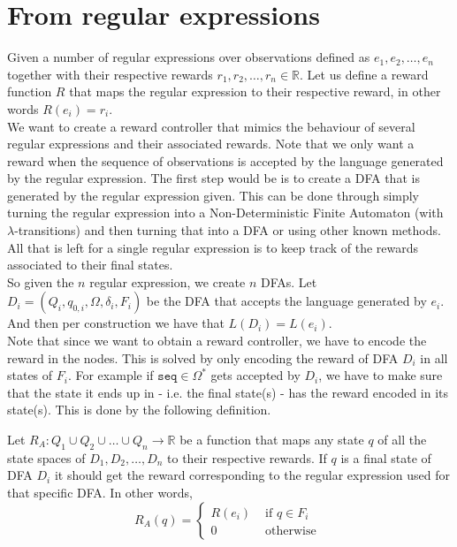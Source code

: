 \section{From regular expressions}
\label{sec:rc-regex}


Given a number of regular expressions over observations defined as $e_1,e_2,\dots,e_n$ together with their respective rewards $r_1,r_2,\dots,r_n\in\mathbb{R}$. Let us define a reward function $R$ that maps the regular expression to their respective reward, in other words $R(e_i)=r_i$. \\

We want to create a reward controller that mimics the behaviour of several regular expressions and their associated rewards. Note that we only want a reward when the sequence of observations is accepted by the language generated by the regular expression. The first step would be is to create a DFA that is generated by the regular expression given. This can be done through simply turning the regular expression into a Non-Deterministic Finite Automaton (with $\lambda$-transitions) and then turning that into a DFA or using other known methods\cite{p:regex-to-dfa}. All that is left for a single regular expression is to keep track of the rewards associated to their final states.\\

So given the $n$ regular expression, we create $n$ DFAs. Let $D_i=(Q_i,q_{0,i},\Omega, \delta_i,F_i)$ be the DFA that accepts the language generated by $e_i$. And then per construction we have that $L(D_i)=L(e_i)$. \\

Note that since we want to obtain a reward controller, we have to encode the reward in the nodes. This is solved by only encoding the reward of DFA $D_i$ in all states of $F_i$. For example if $\texttt{seq}\in\Omega^*$ gets accepted by $D_i$, we have to make sure that the state it ends up in - i.e. the final state(s) - has the reward encoded in its state(s). This is done by the following definition.
\begin{definition}
Let $R_A:Q_1\cup Q_2\cup\dots\cup Q_n\to\mathbb{R}$ be a function that maps any state $q$ of all the state spaces of $D_1,D_2,\dots,D_n$ to their respective rewards. If $q$ is a final state of DFA $D_i$ it should get the reward corresponding to the regular expression used for that specific DFA. In other words,
\begin{equation*}
R_A(q) = \begin{cases}
R(e_i) & \text{ if } q\in F_i \\
0 & \text{ otherwise }
\end{cases}
\end{equation*}
\label{d:associated_reward}
\end{definition}

